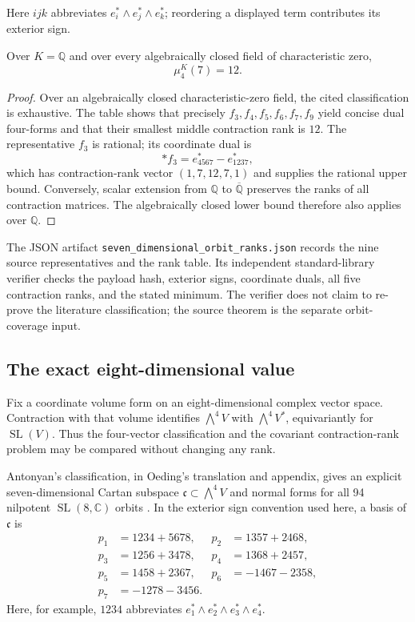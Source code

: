 Here $ijk$ abbreviates $e_i^*\wedge e_j^*\wedge e_k^*$; reordering a
displayed term contributes its exterior sign.

\begin{theorem}
\label{thm:mu-four-seven}
Over $K=\mathbb Q$ and over every algebraically closed field of
characteristic zero,
\[
  \mu_4^K(7)=12.
\]
\end{theorem}

\begin{proof}
Over an algebraically closed characteristic-zero field, the cited
classification is exhaustive.  The table shows that precisely
$f_3,f_4,f_5,f_6,f_7,f_9$ yield concise dual four-forms and that their
smallest middle contraction rank is $12$.  The representative $f_3$ is
rational; its coordinate dual is
\[
  *f_3=e_{4567}^*-e_{1237}^*,
\]
which has contraction-rank vector $(1,7,12,7,1)$ and supplies the rational
upper bound.  Conversely, scalar extension from $\mathbb Q$ to
$\overline{\mathbb Q}$ preserves the ranks of all contraction matrices.
The algebraically closed lower bound therefore also applies over
$\mathbb Q$.
\end{proof}

The JSON artifact
\texttt{seven\_dimensional\_orbit\_ranks.json} records the nine source
representatives and the rank table.  Its independent standard-library
verifier checks the payload hash, exterior signs, coordinate duals, all
five contraction ranks, and the stated minimum.  The verifier does not
claim to re-prove the literature classification; the source theorem is
the separate orbit-coverage input.

\subsection{The exact eight-dimensional value}

Fix a coordinate volume form on an eight-dimensional complex vector space.
Contraction with that volume identifies $\bigwedge^4V$ with
$\bigwedge^4V^*$, equivariantly for $\operatorname{SL}(V)$.  Thus the
four-vector classification and the covariant contraction-rank problem may be
compared without changing any rank.

Antonyan's classification, in Oeding's translation and appendix, gives an
explicit seven-dimensional Cartan subspace $\mathfrak c\subset\bigwedge^4V$
and normal forms for all 94 nilpotent $\operatorname{SL}(8,\mathbb C)$ orbits
\cite{Oeding2022Antonyan}.  In the exterior sign convention used here, a basis
of $\mathfrak c$ is
\[
\begin{split}
 p_1&=1234+5678, & p_2&=1357+2468,\\
 p_3&=1256+3478, & p_4&=1368+2457,\\
 p_5&=1458+2367, & p_6&=-1467-2358,\\
 p_7&=-1278-3456.
\end{split}
\]
Here, for example, $1234$ abbreviates
$e_1^*\wedge e_2^*\wedge e_3^*\wedge e_4^*$.

